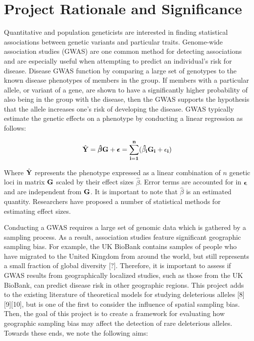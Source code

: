 \section{Project Rationale and Significance}
Quantitative and population geneticists are interested in finding statistical associations between genetic variants and particular traits. Genome-wide association studies (GWAS) are one common method for detecting associations and are especially useful when attempting to predict an individual’s risk for disease. Disease GWAS function by comparing a large set of genotypes to the known disease phenotypes of members in the group. If members with a particular allele, or variant of a gene, are shown to have a significantly higher probability of also being in the group with the disease, then the GWAS supports the hypothesis that the allele increases one’s risk of developing the disease. GWAS typically estimate the genetic effects on a phenotype by conducting a linear regression as follows:\cite{dudbridge_2013} \cite{xie_xu_1998}

\begin{equation}
    \hat{\bf{Y}} = \boldsymbol{\hat{\beta}} \bf{G} + \boldsymbol{\epsilon} = \sum_{i=1}^{n} (\hat{\beta_i} G_i + \epsilon_i) 
\end{equation}

Where $\hat{\bf{Y}}$ represents the phenotype expressed as a linear combination of $n$ genetic loci in matrix $\bf{G}$ scaled by their effect sizes $\hat{\beta}$. Error terms are accounted for in $\boldsymbol{\epsilon}$ and are independent from $\bf{G}$. It is important to note that $\hat{\beta}$ is an estimated quantity. Researchers have proposed a number of statistical methods for estimating effect sizes. \cite{meuwissen_etal._2001} \cite{park_etal._2011}



Conducting a GWAS requires a large set of genomic data which is gathered by a sampling process. As a result, association studies feature significant geographic sampling bias. For example, the UK BioBank contains samples of people who have migrated to the United Kingdom from around the world, but still represents a small fraction of global diversity [?]. Therefore, it is important to assess if GWAS results from geographically localized studies, such as those from the UK BioBank, can predict disease risk in other geographic regions. This project adds to the existing literature of theoretical models for studying deleterious alleles [8][9][10], but is one of the first to consider the influence of spatial sampling bias. Then, the goal of this project is to create a framework for evaluating how geographic sampling bias may affect the detection of rare deleterious alleles. Towards these ends, we note the following aims:	

